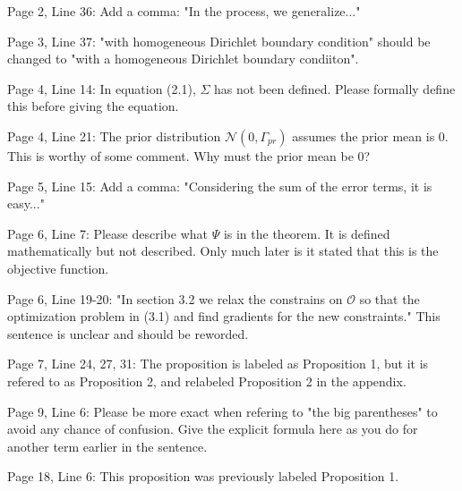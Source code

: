 \documentclass{amsart}
\numberwithin{equation}{section}
\begin{document}
Page 2, Line 36: Add a comma: "In the process, we generalize..." 

Page 3, Line 37: "with homogeneous Dirichlet boundary condition"
should be changed to "with a homogeneous Dirichlet boundary
condiiton". 

Page 4, Line 14: In equation (2.1), $\Sigma$ has not been
defined. Please formally define this before giving the equation.

Page 4, Line 21: The prior distribution $\mathcal{N}(0,\Gamma_{pr})$
assumes the prior mean is 0. This is worthy of some comment. Why must
the prior mean be 0? 

Page 5, Line 15: Add a comma: "Considering the sum of the error terms,
it is easy..." 

Page 6, Line 7: Please describe what $\Psi$ is in the theorem. It is
defined mathematically but not described. Only much later is it stated
that this is the objective function. 

Page 6, Line 19-20: "In section 3.2 we relax the constrains on
$\mathcal{O}$ so that the optimization problem in (3.1) and find
gradients for the new constraints." This sentence is unclear and
should be reworded.

Page 7, Line 24, 27, 31: The proposition is labeled as Proposition 1,
but it is refered to as Proposition 2, and relabeled Proposition 2 in
the appendix. 

Page 9, Line 6: Please be more exact when refering to "the big
parentheses" to avoid any chance of confusion. Give the explicit
formula here as you do for another term earlier in the
sentence. 

Page 18, Line 6: This proposition was previously labeled Proposition
1. 
\end{document}
